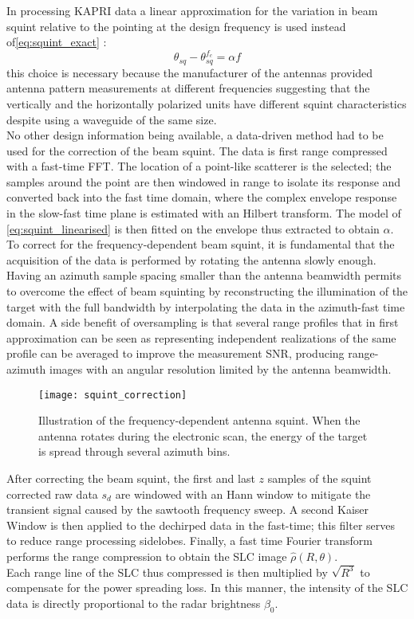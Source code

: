 In processing KAPRI data a linear approximation for  the variation in beam squint relative to the pointing at the design frequency is used instead of\autoref{eq:squint_exact} :
\begin{equation}\label{eq:squint_linearised}
	\theta_{sq} - \theta_{sq}^{f_{c}}  =  \alpha f
\end{equation}
this choice is necessary because the manufacturer of the antennas provided antenna pattern measurements at different frequencies suggesting that the vertically and the horizontally polarized units have different squint characteristics despite using a waveguide of the same size.\\ No other design information being available, a data-driven method had to be used for the correction of the beam squint.  The data is first range compressed with a fast-time FFT. The location of a point-like scatterer is the selected; the samples around the point are then windowed in range to isolate its response and converted back into the fast time domain, where the complex envelope response in the slow-fast time plane is estimated with an Hilbert transform. The model of \autoref{eq:squint_linearised} is then fitted on the envelope thus extracted to obtain $\alpha$.
To correct for the frequency-dependent beam squint, it is fundamental that the acquisition of the data is performed by rotating the antenna slowly enough. Having an azimuth sample spacing smaller than the antenna beamwidth permits to overcome the effect of beam squinting by reconstructing the illumination of the target with the full bandwidth by interpolating the data in the azimuth-fast time domain. A side benefit of oversampling is that several range profiles that in first approximation can be seen as representing independent realizations of the same profile can be averaged to improve the measurement SNR, producing range-azimuth images with an angular resolution limited by the antenna beamwidth.\\
\begin{figure}[ht]
	\centering
	\texttt{[image: squint\_correction]}
	\caption{Illustration of the frequency-dependent antenna squint. When the antenna rotates during the electronic scan, the energy of the target is spread through several azimuth bins.}
	\label{fig:squint_correction}
\end{figure}
After correcting the beam squint,  the first and last $z$ samples of the squint corrected raw data $s_{d}$ are windowed with an Hann window to mitigate the transient signal caused by the sawtooth frequency sweep. A second Kaiser Window is then applied to the dechirped data in the fast-time; this filter serves to reduce range processing sidelobes. Finally, a fast time Fourier transform performs the range compression to obtain the SLC image $\hat{\rho}\left(R, \theta\right)$.\\ Each range line of the SLC thus compressed is then multiplied by $\sqrt{R^3}$ to compensate for the power spreading loss. In this manner, the intensity of the SLC data is directly proportional to the radar brightness $\beta_{0}$.
